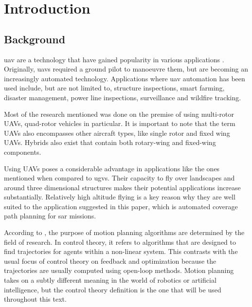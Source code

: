 \chapter{Introduction}
\label{chp:intro}

\section{Background}
\label{sec:intro_bg}
\ac{uav} are a technology that have gained popularity in various applications \cite{CPP-Survey-2019}. Originally, \acp{uav} required a ground pilot to manoeuvre them, but are becoming an increasingly automated technology. Applications where \ac{uav} automation has been used include, but are not limited to, structure inspections\cite{Guerrero2013}, smart farming\cite{Lottes2017}, disaster management\cite{Maza2011}, power line inspections\cite{Chang2017}, surveillance\cite{Basilico2015} and wildfire tracking\cite{Pham2017}.

Most of the research mentioned was done on the premise of using multi-rotor UAVs, quad-rotor vehicles in particular. It is important to note that the term UAVs also encompasses other aircraft types, like single rotor and fixed wing UAVs. Hybrids also exist that contain both rotary-wing and fixed-wing components\cite{CPP-Survey-2019}.

Using UAVs poses a considerable advantage in applications like the ones mentioned when compared to \acp{ugv}. Their capacity to fly over landscapes and around three dimensional structures makes their potential applications increase substantially. Relatively high altitude flying is a key reason why they are well suited to the application suggested in this paper, which is automated coverage path planning for \ac{sar} missions.

According to \cite{Lavalle2006}, the purpose of motion planning algorithms are determined by the field of research. In control theory, it refers to algorithms that are designed to find trajectories for agents within a non-linear system. This contrasts with the usual focus of control theory on feedback and optimization because the trajectories are usually computed using open-loop methods. Motion planning takes on a subtly different meaning in the world of robotics or artificial intelligence, but the control theory definition is the one that will be used throughout this text. 


